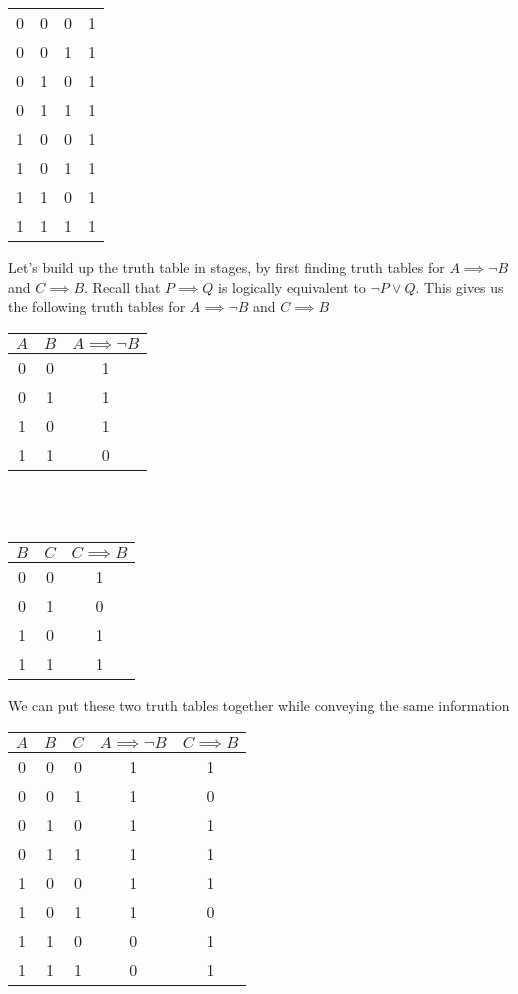 \documentclass[11pt, preview]{standalone} %
\begin{document}
\begin{enumerate}
\begin{Choices}
\begin{enumerate}[(a)]
\begin{tabular}{ c | c | c || c }
      \hline
      0 & 0 & 0 & 1 \\
      0 & 0 & 1 & 1 \\
      0 & 1 & 0 & 1 \\
      0 & 1 & 1 & 1 \\
      1 & 0 & 0 & 1 \\
      1 & 0 & 1 & 1 \\
      1 & 1 & 0 & 1 \\
      1 & 1 & 1 & 1 
    \end{tabular}
    \Solution Let's build up the truth table in stages, by first finding truth tables for $A \implies \lnot B$ and $C \implies B$. Recall that $P \implies Q$ is logically equivalent to $\lnot P \lor Q$. This gives us the following truth tables for $A \implies \lnot B$ and $C \implies B$

    \begin{tabular}{ c | c || c}
    $A$ & $B$ & $A \implies \lnot B$\\
    \hline
    0 & 0 & 1\\
    0 & 1 & 1\\
    1 & 0 & 1\\
    1 & 1 & 0
    \end{tabular}\\ 
    \\
    \begin{tabular}{ c | c || c}
    $B$ & $C$ & $C \implies B$\\
    \hline
    0 & 0 & 1\\
    0 & 1 & 0\\
    1 & 0 & 1\\
    1 & 1 & 1
    \end{tabular}

    We can put these two truth tables together while conveying the same information

    \begin{tabular}{ c | c | c || c | c}
    $A$ & $B$ & $C$ & $A \implies \lnot B$ & $C \implies B$\\
    \hline
    0 & 0 & 0 & 1 & 1\\
    0 & 0 & 1 & 1 & 0\\
    0 & 1 & 0 & 1 & 1\\
    0 & 1 & 1 & 1 & 1\\
    1 & 0 & 0 & 1 & 1\\
    1 & 0 & 1 & 1 & 0\\
    1 & 1 & 0 & 0 & 1\\
    1 & 1 & 1 & 0 & 1
    \end{tabular}


\end{enumerate}
\end{Choices}
\end{enumerate}
\end{document}
